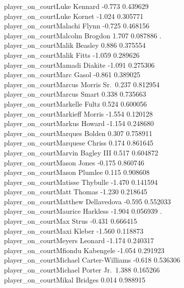 \documentclass[
  landscape]{article}
\begin{document}
player\_on\_courtLuke Kennard -0.773 0.439629\\
player\_on\_courtLuke Kornet -1.024 0.305771\\
player\_on\_courtMalachi Flynn -0.725 0.468156\\
player\_on\_courtMalcolm Brogdon 1.707 0.087886 .\\
player\_on\_courtMalik Beasley 0.886 0.375554\\
player\_on\_courtMalik Fitts -1.059 0.289626\\
player\_on\_courtMamadi Diakite -1.091 0.275306\\
player\_on\_courtMarc Gasol -0.861 0.389025\\
player\_on\_courtMarcus Morris Sr.~0.237 0.812954\\
player\_on\_courtMarcus Smart 0.338 0.735663\\
player\_on\_courtMarkelle Fultz 0.524 0.600056\\
player\_on\_courtMarkieff Morris -1.554 0.120128\\
player\_on\_courtMarkus Howard -1.154 0.248680\\
player\_on\_courtMarques Bolden 0.307 0.758911\\
player\_on\_courtMarquese Chriss 0.174 0.861645\\
player\_on\_courtMarvin Bagley III 0.517 0.604872\\
player\_on\_courtMason Jones -0.175 0.860746\\
player\_on\_courtMason Plumlee 0.115 0.908608\\
player\_on\_courtMatisse Thybulle -1.470 0.141594\\
player\_on\_courtMatt Thomas -1.230 0.218645\\
player\_on\_courtMatthew Dellavedova -0.595 0.552033\\
player\_on\_courtMaurice Harkless -1.904 0.056939 .\\
player\_on\_courtMax Strus -0.431 0.666415\\
player\_on\_courtMaxi Kleber -1.560 0.118873\\
player\_on\_courtMeyers Leonard -1.174 0.240317\\
player\_on\_courtMfiondu Kabengele -1.054 0.291923\\
player\_on\_courtMichael Carter-Williams -0.618 0.536306\\
player\_on\_courtMichael Porter Jr.~1.388 0.165266\\
player\_on\_courtMikal Bridges 0.014 0.988915\\
\end{document}
